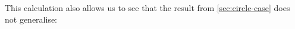 \documentclass[english,a4]{article}
\newcommand{\setTrunc}[1]{\Trunc{#1}_0}
\begin{document}

This calculation also allows us to see that the result from \cref{sec:circle-case} does not generalise:
\end{document}
